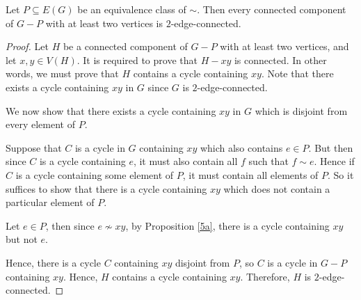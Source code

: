 \documentclass{unswmaths}
\begin{document}
\begin{proposition}[Part (d)]
\label{5d}
    Let $P \subseteq E(G)$ be an equivalence class of $\sim$. Then every connected
    component of $G-P$ with at least two vertices is $2$-edge-connected.
\end{proposition}
\begin{proof}
    Let $H$ be a connected component of $G-P$ with at least two vertices, and 
    let $x,y \in V(H)$. It is required to prove that $H - xy$ is connected. 
    In other words, we must prove that $H$ contains a cycle containing $xy$. 
    Note that there exists a cycle containing $xy$ in $G$ since $G$ is $2$-edge-connected.
    
    We now show that there exists a cycle containing $xy$ in $G$ which is disjoint
    from every element of $P$. 
    
    Suppose that $C$ is a cycle in $G$ containing $xy$ which also contains $e \in P$.
    But then since $C$ is a cycle containing $e$, it must also contain all $f$
    such that $f \sim e$. Hence if $C$ is a cycle containing some element of $P$,
    it must contain all elements of $P$. So it suffices to show that there is a cycle
    containing $xy$ which does not contain a particular element of $P$.
    
    Let $e \in P$, then since $e \nsim xy$, by Proposition \ref{5a}, there is a cycle
    containing $xy$ but not $e$.
    
    Hence, there is a cycle $C$ containing $xy$ disjoint from $P$, so $C$ is a cycle
    in $G-P$ containing $xy$. Hence, $H$ contains a cycle containing $xy$. Therefore,
    $H$ is $2$-edge-connected.
\end{proof}
\end{document}
